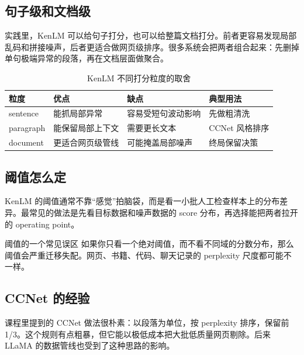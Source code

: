 \subsection{句子级和文档级}

实践里，KenLM 可以给句子打分，也可以给整篇文档打分。前者更容易发现局部乱码和拼接噪声，后者更适合做网页级排序。很多系统会把两者组合起来：先删掉单句极端异常的段落，再在文档层面做聚合。

\begin{table}[H]
\centering
\small
\renewcommand{\arraystretch}{1.15}
\begin{tabular}{p{2.4cm}p{4.2cm}p{4.2cm}p{3.0cm}}
\toprule
\textbf{粒度} & \textbf{优点} & \textbf{缺点} & \textbf{典型用法} \\
\midrule
sentence & 能抓局部异常 & 容易受短句波动影响 & 先做粗清洗 \\
paragraph & 能保留局部上下文 & 需要更长文本 & CCNet 风格排序 \\
document & 更适合网页级管线 & 可能掩盖局部噪声 & 终局保留决策 \\
\bottomrule
\end{tabular}
\caption{KenLM 不同打分粒度的取舍}
\end{table}

\subsection{阈值怎么定}

KenLM 的阈值通常不靠“感觉”拍脑袋，而是看一小批人工检查样本上的分布差异。最常见的做法是先看目标数据和噪声数据的 score 分布，再选择能把两者拉开的 operating point。

\begin{warningbox}{阈值的一个常见误区}
如果你只看一个绝对阈值，而不看不同域的分数分布，那么阈值会严重迁移失配。网页、书籍、代码、聊天记录的 perplexity 尺度都可能不一样。
\end{warningbox}

\subsection{CCNet 的经验}

课程里提到的 CCNet 做法很朴素：以段落为单位，按 perplexity 排序，保留前 1/3。这个规则有点粗暴，但它能以极低成本把大批低质量网页剔除。后来 LLaMA 的数据管线也受到了这种思路的影响。

